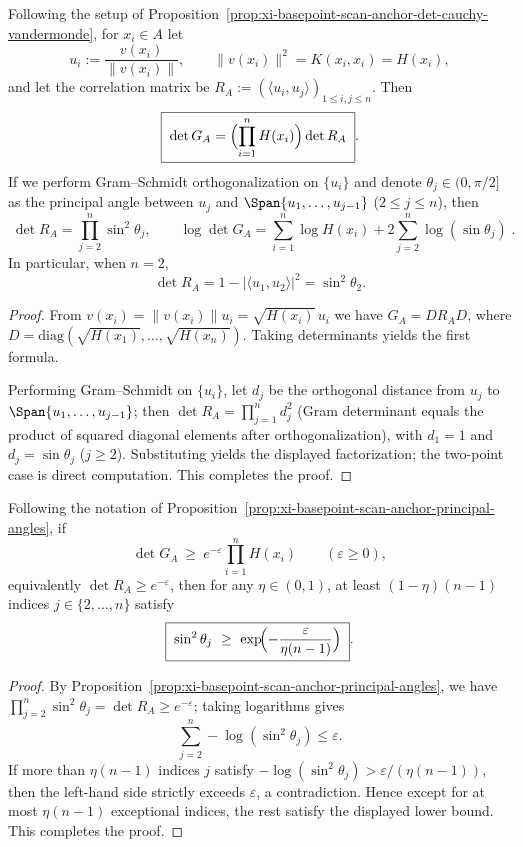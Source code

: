\begin{proposition}\label{prop:xi-basepoint-scan-anchor-principal-angles}
Following the setup of Proposition~\ref{prop:xi-basepoint-scan-anchor-det-cauchy-vandermonde}, for \(x_i\in A\) let
\[
u_i:=\frac{v(x_i)}{\|v(x_i)\|},\qquad
\|v(x_i)\|^2=K(x_i,x_i)=H(x_i),
\]
and let the correlation matrix be \(R_A:=(\langle u_i,u_j\rangle)_{1\le i,j\le n}\).
Then
\[
\boxed{\;
\det G_A=\Bigl(\prod_{i=1}^{n}H(x_i)\Bigr)\det R_A\; }.
\]
If we perform Gram--Schmidt orthogonalization on \(\{u_i\}\) and denote \(\theta_j\in(0,\pi/2]\) as the principal angle between \(u_j\) and \(\Span\{u_1,\dots,u_{j-1}\}\) (\(2\le j\le n\)), then
\[
\boxed{\;
\det R_A=\prod_{j=2}^{n}\sin^2\theta_j,\qquad
\log\det G_A=\sum_{i=1}^{n}\log H(x_i)+2\sum_{j=2}^{n}\log(\sin\theta_j)\; }.
\]
In particular, when \(n=2\),
\[
\det R_A=1-|\langle u_1,u_2\rangle|^2=\sin^2\theta_2.
\]
\end{proposition}
\begin{proof}
From \(v(x_i)=\|v(x_i)\|u_i=\sqrt{H(x_i)}\,u_i\) we have \(G_A=DR_AD\), where \(D=\mathrm{diag}(\sqrt{H(x_1)},\dots,\sqrt{H(x_n)})\).
Taking determinants yields the first formula.
\par
Performing Gram--Schmidt on \(\{u_i\}\), let \(d_j\) be the orthogonal distance from \(u_j\) to \(\Span\{u_1,\dots,u_{j-1}\}\); then \(\det R_A=\prod_{j=1}^{n}d_j^2\) (Gram determinant equals the product of squared diagonal elements after orthogonalization), with \(d_1=1\) and \(d_j=\sin\theta_j\) (\(j\ge 2\)).
Substituting yields the displayed factorization; the two-point case is direct computation. This completes the proof.
\end{proof}

\begin{corollary}\label{cor:xi-basepoint-scan-anchor-angle-concentration}
Following the notation of Proposition~\ref{prop:xi-basepoint-scan-anchor-principal-angles}, if
\[
\det G_A\ \ge\ e^{-\varepsilon}\prod_{i=1}^{n}H(x_i)\qquad(\varepsilon\ge 0),
\]
equivalently \(\det R_A\ge e^{-\varepsilon}\), then for any \(\eta\in(0,1)\), at least \((1-\eta)(n-1)\) indices \(j\in\{2,\dots,n\}\) satisfy
\[
\boxed{\;
\sin^2\theta_j\ \ge\ \exp\!\Bigl(-\frac{\varepsilon}{\eta(n-1)}\Bigr)\; }.
\]
\end{corollary}
\begin{proof}
By Proposition~\ref{prop:xi-basepoint-scan-anchor-principal-angles}, we have \(\prod_{j=2}^{n}\sin^2\theta_j=\det R_A\ge e^{-\varepsilon}\); taking logarithms gives
\[
\sum_{j=2}^{n}-\log(\sin^2\theta_j)\le \varepsilon.
\]
If more than \(\eta(n-1)\) indices \(j\) satisfy \(-\log(\sin^2\theta_j)>\varepsilon/(\eta(n-1))\), then the left-hand side strictly exceeds \(\varepsilon\), a contradiction.
Hence except for at most \(\eta(n-1)\) exceptional indices, the rest satisfy the displayed lower bound. This completes the proof.
\end{proof}

